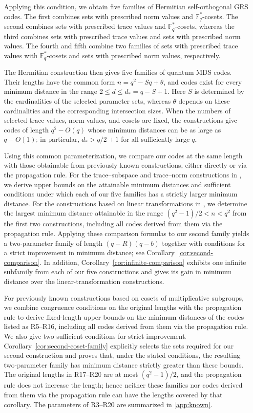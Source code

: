 \documentclass[preprint,12pt,a4paper]{elsarticle}
\begin{document}
Applying this condition, we obtain five families of Hermitian self-orthogonal GRS codes. The first combines sets with prescribed norm values and $\mathbb F_q^{*}$-cosets. The second combines sets with prescribed trace values and $\mathbb F_q^{*}$-cosets, whereas the third combines sets with prescribed trace values and sets with prescribed norm values. The fourth and fifth combine two families of sets with prescribed trace values with $\mathbb F_q^{*}$-cosets and sets with prescribed norm values, respectively.

The Hermitian construction then gives five families of quantum MDS codes. Their lengths have the common form $n=q^2-Sq+\theta$, and codes exist for every minimum distance in the range $2\le d\le d_*=q-S+1$. Here $S$ is determined by the cardinalities of the selected parameter sets, whereas $\theta$ depends on these cardinalities and the corresponding intersection sizes. When the numbers of selected trace values, norm values, and cosets are fixed, the constructions give codes of length $q^2-O(q)$ whose minimum distances can be as large as $q-O(1)$; in particular, $d_*>q/2+1$ for all sufficiently large $q$.

Using this common parameterization, we compare our codes at the same length with those obtainable from previously known constructions, either directly or via the propagation rule. For the trace--subspace and trace--norm constructions in \cite{FangWenFu2024}, we derive upper bounds on the attainable minimum distances and sufficient conditions under which each of our five families has a strictly larger minimum distance. For the constructions based on linear transformations in \cite{LiLiuJiang2026}, we determine the largest minimum distance attainable in the range $(q^2-1)/2<n<q^2$ from the first two constructions, including all codes derived from them via the propagation rule. Applying these comparison formulas to our second family yields a two-parameter family of length $(q-R)(q-b)$ together with conditions for a strict improvement in minimum distance; see Corollary~\ref{cor:second-comparison}. In addition, Corollary~\ref{cor:infinite-comparison} exhibits one infinite subfamily from each of our five constructions and gives its gain in minimum distance over the linear-transformation constructions.

For previously known constructions based on cosets of multiplicative subgroups, we combine congruence conditions on the original lengths with the propagation rule to derive fixed-length upper bounds on the minimum distances of the codes listed as R5--R16, including all codes derived from them via the propagation rule. We also give two sufficient conditions for strict improvement. Corollary~\ref{cor:second-coset-family} explicitly selects the sets required for our second construction and proves that, under the stated conditions, the resulting two-parameter family has minimum distance strictly greater than these bounds. The original lengths in R17--R20 are at most $(q^2-1)/2$, and the propagation rule does not increase the length; hence neither these families nor codes derived from them via the propagation rule can have the lengths covered by that corollary. The parameters of R3--R20 are summarized in \ref{app:known}.
\end{document}
